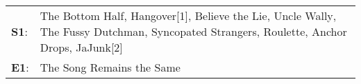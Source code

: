 \begin{supertabular}{p{0.03\textwidth}p{0.92\textwidth}}
 \textbf{S1}:  &  The Bottom Half\textsuperscript{}, \enspace Hangover[1]\textsuperscript{}, \enspace Believe the Lie\textsuperscript{}, \enspace Uncle Wally\textsuperscript{}, \enspace The Fussy Dutchman\textsuperscript{}, \enspace Syncopated Strangers\textsuperscript{}, \enspace Roulette\textsuperscript{}, \enspace Anchor Drops\textsuperscript{}, \enspace JaJunk[2]\textsuperscript{}  \enspace  \\
 \textbf{E1}:  &                                                                                                                                                                                                                                                                                                                                        The Song Remains the Same\textsuperscript{}  \enspace  \\
\end{supertabular}
